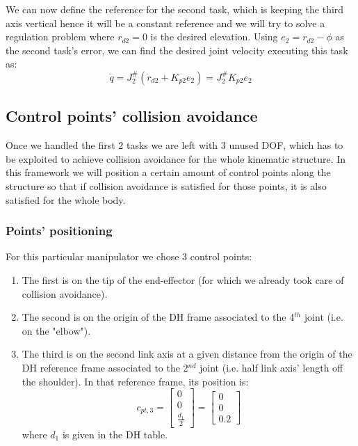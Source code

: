 \documentclass[12pt, a4paper]{article}
\begin{document}
We can now define the reference for the second task, which is keeping the third axis vertical hence it will be a constant reference and we will try to solve a regulation problem where $r_{d2} = 0$ is the desired elevation. Using $e_2 = r_{d2} - \phi$ as the second task's error, we can find the desired joint velocity executing this task as:
\begin{equation}
\dot{q} = J_2^{\#}(\dot{r}_{d2} + K_{p2}e_2)=J_2^{\#}K_{p2}e_2
\end{equation}
\subsection[Tasks 3 \& 4]{Control points' collision avoidance}
Once we handled the first 2 tasks we are left with 3 unused DOF, which has to be exploited to achieve collision avoidance for the whole kinematic structure. In this framework we will position a certain amount of control points along the structure so that if collision avoidance is satisfied for those points, it is also satisfied for the whole body.

\subsubsection{Points' positioning}

For this particular manipulator we chose 3 control points:
\begin{enumerate}
\item The first is on the tip of the end-effector (for which we already took care of collision avoidance).
\item The second is on the origin of the DH frame associated to the 4$^{th}$ joint (i.e. on the "elbow").
\item The third is on the second link axis at a given distance from the origin of the DH reference frame associated to the 2$^{nd}$ joint (i.e. half link axis' length off the shoulder). In that reference frame, its position is:
\[c_{pt,3} = \begin{bmatrix}
0\\0\\ \frac{d_1}{2}
\end{bmatrix} = \begin{bmatrix}
0\\0\\ 0.2
\end{bmatrix}
\] where $d_1$ is given in the DH table.
\end{enumerate}
\end{document}
